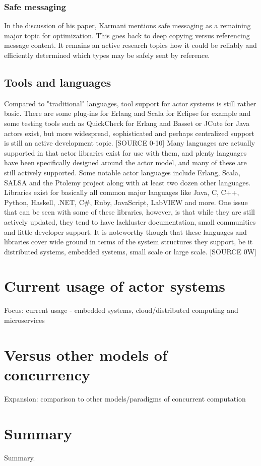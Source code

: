\documentclass[A4]{article}
\begin{document}
\subsubsection{Safe messaging}
In the discussion of his paper, Karmani mentions safe messaging as a remaining major topic for optimization. This goes back to deep copying versus referencing message content. It remains an active research topics how it could be reliably and efficiently determined which types may be safely sent by reference.

\subsection{Tools and languages}
Compared to "traditional" languages, tool support for actor systems is still rather basic. There are some plug-ins for Erlang and Scala for Eclipse for example and some testing tools such as QuickCheck for Erlang and Basset or JCute for Java actors exist, but more widespread, sophisticated and perhaps centralized support is still an active development topic. [SOURCE 0-10]
Many languages are actually supported in that actor libraries exist for use with them, and plenty languages have been specifically designed around the actor model, and many of these are still actively supported. Some notable actor languages include Erlang, Scala, SALSA and the Ptolemy project along with at least two dozen other languages. Libraries exist for basically all common major languages like Java, C, C++, Python, Haskell, .NET, C\#, Ruby, JavaScript, LabVIEW and more. One issue that can be seen with some of these libraries, however, is that while they are still actively updated, they tend to have lackluster documentation, small communities and little developer support. It is noteworthy though that these languages and libraries cover wide ground in terms of the system structures they support, be it distributed systems, embedded systems, small scale or large scale. [SOURCE 0W]

\section{Current usage of actor systems}
Focus: current usage - embedded systems, cloud/distributed computing and microservices

\section{Versus other models of concurrency}
Expansion: comparison to other models/paradigms of concurrent computation

\section{Summary}
\label{summary}
Summary.

\nocite{robotron,
stonx,vice,650sim,herculessim,zib,4004,thermal1,thermal2,rojas}




\end{document}

